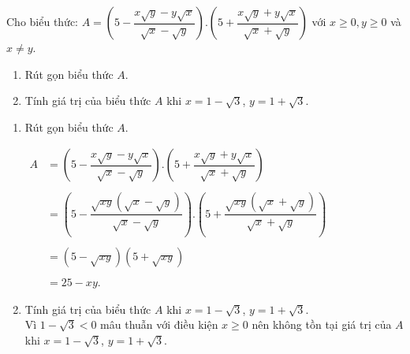 \begin{ex}%
 Cho biểu thức: $A=\left(5-\dfrac{x\sqrt{y}-y\sqrt{x}}{\sqrt{x}-\sqrt{y}}\right).\left(5+\dfrac{x\sqrt{y}+y\sqrt{x}}{\sqrt{x}+\sqrt{y}}\right)$ với $x\ge0,y\ge0$ và $x\ne y$.
 \begin{enumerate}
 	\item Rút gọn biểu thức $A$.
 	\item Tính giá trị của biểu thức $A$ khi $x=1-\sqrt{3}$, $y=1+\sqrt{3}$.
 \end{enumerate}
\loigiai
    {
    	 \begin{enumerate}
    		\item Rút gọn biểu thức $A$.
    		    		\begin{center}
    		$\begin{array}{ll}
    			A&=\left(5-\dfrac{x\sqrt{y}-y\sqrt{x}}{\sqrt{x}-\sqrt{y}}\right).\left(5+\dfrac{x\sqrt{y}+y\sqrt{x}}{\sqrt{x}+\sqrt{y}}\right)\\\\
    	&=\left(5-\dfrac{\sqrt{xy}(\sqrt{x}-\sqrt{y})}{\sqrt{x}-\sqrt{y}}\right).\left(5+\dfrac{\sqrt{xy}(\sqrt{x}+\sqrt{y})}{\sqrt{x}+\sqrt{y}}\right)\\\\
    			&=(5-\sqrt{xy})(5+\sqrt{xy})\\\\
    			&=25-xy.
    			\end{array}$
    		\end{center}
    		\item Tính giá trị của biểu thức $A$ khi $x=1-\sqrt{3}$, $y=1+\sqrt{3}$.\\
    		Vì $1-\sqrt{3}<0$ mâu thuẫn với điều kiện $x\ge 0$ nên không tồn tại giá trị của $A$ khi $x=1-\sqrt{3}$, $y=1+\sqrt{3}$.
  \end{enumerate}}
\end{ex}

